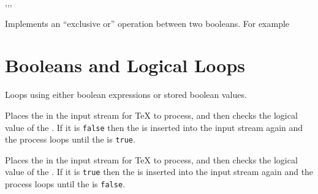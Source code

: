 \documentclass[oneside]{book}
\begin{document}
\begin{function}{\boolVarXor,\boolVarXorT,\boolVarXorF,\boolVarXorTF}
\begin{syntax}
  
   
   
    
\end{syntax}
Implements an \enquote{exclusive or} operation between two booleans.
For example
\begin{demohigh}
 {} {} {}
\end{demohigh}
\end{function}

\section{Booleans and Logical Loops}

Loops using either boolean expressions or stored boolean values.

\begin{function}{\boolVarDoUntil}
\begin{syntax}
  
\end{syntax}
Places the  in the input stream for \TeX{} to process,
and then checks the logical value of the .  If it is
\texttt{false} then the  is inserted into the input
stream again and the process loops until the  is
\texttt{true}.
\begin{demohigh}
\IgnoreSpacesOn
\boolSetFalse \lTmpaBool
\intZero \lTmpaInt
\clistClear \lTmpaClist
\boolVarDoUntil {}
\clistVarJoin \lTmpaClist {:}
\IgnoreSpacesOff
\end{demohigh}
\end{function}

\begin{function}{\boolVarDoWhile}
\begin{syntax}
  
\end{syntax}
Places the  in the input stream for \TeX{} to process,
and then checks the logical value of the .  If it is
\texttt{true} then the  is inserted into the input
stream again and the process loops until the  is
\texttt{false}.
\begin{demohigh}
\IgnoreSpacesOn
\boolSetTrue \lTmpaBool
\intZero \lTmpaInt
\clistClear \lTmpaClist
\boolVarDoWhile {}
\clistVarJoin \lTmpaClist {:}
\IgnoreSpacesOff
\end{demohigh}
\end{function}
\end{document}
